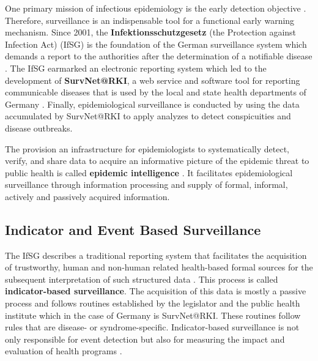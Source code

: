  One primary mission of infectious epidemiology is the early detection objective \citep{EarlyDetection}.
  Therefore, surveillance is an indispensable tool for a functional early warning mechanism.
  Since 2001, the \textbf{Infektionsschutzgesetz} (the Protection against Infection Act) (\gls{IfSG})
  is the foundation of the German surveillance system which demands a report to the authorities after the determination of a notifiable disease \citep{IfSG}.
  The IfSG earmarked an electronic reporting system which led to the development of \textbf{SurvNet@RKI}, a web service and software tool for reporting communicable diseases that is used by the local and state health departments of Germany \citep{Faensen2006}.
  Finally, epidemiological surveillance is conducted by using the data accumulated by SurvNet@RKI to apply analyzes to detect conspicuities and disease outbreaks.

  The provision an infrastructure for epidemiologists to systematically detect, verify, and share data to acquire an informative picture of the epidemic threat to public health is called \textbf{epidemic intelligence} \citep{EarlyDetection}.
  It facilitates epidemiological surveillance through information processing and supply of formal, informal, actively and passively acquired information.

\subsection{Indicator and Event Based Surveillance}
  The IfSG describes a traditional reporting system that facilitates the acquisition of trustworthy, human and non-human related health-based formal sources for the subsequent interpretation of such structured data \citep{EarlyDetection}.
  This process is called \textbf{indicator-based surveillance}.
  The acquisition of this data is mostly a passive process and follows routines established by the legislator and the public health institute which in the case of Germany is SurvNet@RKI.
  These routines follow rules that are disease- or syndrome-specific.
  Indicator-based surveillance is not only responsible for event detection but also for measuring the impact and evaluation of health programs \citep{EarlyDetection}.

